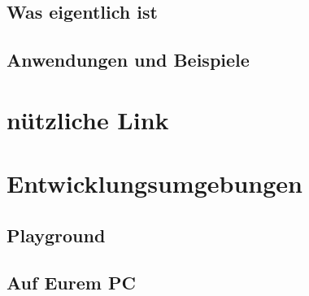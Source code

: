 \subsection{Was eigentlich ist}
\subsection{Anwendungen und Beispiele}




\section{nützliche Link}


\subsection{}



\section{Entwicklungsumgebungen}


\subsection{Playground}
\subsection{Auf Eurem PC}


